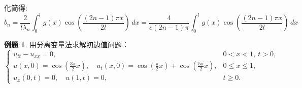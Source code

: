 \documentclass[12pt,a4paper]{article}
\numberwithin{subsection}{section}   %
\numberwithin{subsubsection}{subsection}
\theoremstyle{plain}
\theoremstyle{definition}
\newtheorem{example}{例题}[subsection]  %
\theoremstyle{remark}
\theoremstyle{remark}
\begin{document}
	化简得:
	\begin{equation}
		b_n = \frac{2}{l \lambda_n} \int_0^l g(x) \cos\left(\frac{(2n-1)\pi x}{2l}\right) \, dx = \frac{4}{c(2n-1)\pi} \int_0^l g(x) \cos\left(\frac{(2n-1)\pi x}{2l}\right) \, dx
	\end{equation}
	
	\begin{example}
		用分离变量法求解初边值问题：
		\[
		\begin{cases}
			u_{tt} - u_{xx} = 0, & 0 < x < 1, \ t > 0, \\
			u(x,0) = \cos\left(\frac{3\pi}{2}x\right), \quad u_t(x,0) = \cos\left(\frac{\pi}{2}x\right) + \cos\left(\frac{5\pi}{2}x\right), & 0 \leq x \leq 1, \\
			u_x(0,t) = 0, \quad u(1,t) = 0, & t \geq 0.
		\end{cases}
		\]
	\end{example}
\end{document}

